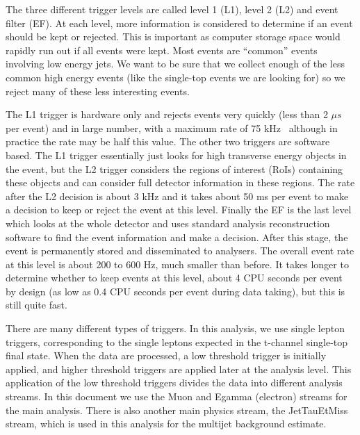 The three different trigger levels are called level 1 (L1), level 2 (L2) and event filter (EF).  At each level, more information is considered to determine if an event should be kept or rejected.  This is important as computer storage space would rapidly run out if all events were kept.  Most events are ``common'' events involving low energy jets.  We want to be sure that we collect enough of the less common high energy events (like the single-top events we are looking for) so we reject many of these less interesting events.

The L1 trigger is hardware only and rejects events very quickly (less than 2 $\mu s$ per event) and in large number, with a maximum rate of 75 kHz~\cite{Trigger2010, Electron} although in practice the rate may be half this value.  The other two triggers are software based.  The L1 trigger essentially just looks for high transverse energy objects in the event, but the L2 trigger considers the regions of interest (RoIs) containing these objects and can consider full detector information in these regions.  The rate after the L2 decision is about 3 kHz and it takes about 50 ms per event to make a decision to keep or reject the event at this level.  Finally the EF is the last level which looks at the whole detector and uses standard analysis reconstruction software to find the event information and make a decision.  After this stage, the event is permanently stored and disseminated to analysers.  The overall event rate at this level is about 200 to 600 Hz, much smaller than before.  It takes longer to determine whether to keep events at this level, about 4 CPU seconds per event by design (as low as 0.4 CPU seconds per event during data taking), but this is still quite fast.

There are many different types of triggers.  In this analysis, we use single lepton triggers, corresponding to the single leptons expected in the t-channel single-top final state.  When the data are processed, a low threshold trigger is initially applied, and higher threshold triggers are applied later at the analysis level.  This application of the low threshold triggers divides the data into different analysis streams.  In this document we use the Muon and Egamma (electron) streams for the main analysis.  There is also another main physics stream, the JetTauEtMiss stream, which is used in this analysis for the multijet background estimate.

